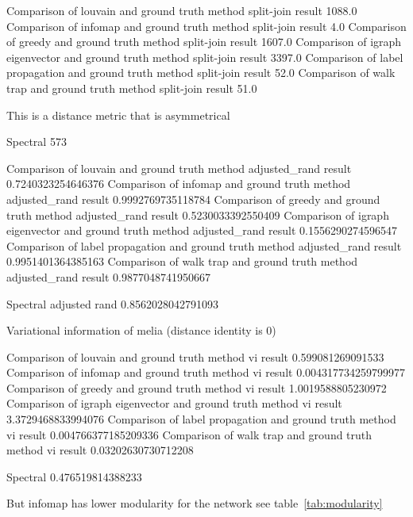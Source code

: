 




Comparison of louvain and ground truth method split-join result 1088.0
Comparison of infomap and ground truth method split-join result 4.0
Comparison of greedy and ground truth method split-join result 1607.0
Comparison of igraph eigenvector and ground truth method split-join result 3397.0
Comparison of label propagation and ground truth method split-join result 52.0
Comparison of walk trap and ground truth method split-join result 51.0

This is a distance metric that is asymmetrical

Spectral 573

Comparison of louvain and ground truth method adjusted\_rand result 0.7240323254646376
Comparison of infomap and ground truth method adjusted\_rand result 0.9992769735118784
Comparison of greedy and ground truth method adjusted\_rand result 0.5230033392550409
Comparison of igraph eigenvector and ground truth method adjusted\_rand result 0.1556290274596547
Comparison of label propagation and ground truth method adjusted\_rand result 0.9951401364385163
Comparison of walk trap and ground truth method adjusted\_rand result 0.9877048741950667


Spectral adjusted rand
0.8562028042791093

Variational information of melia (distance identity is 0)

Comparison of louvain and ground truth method vi result 0.599081269091533
Comparison of infomap and ground truth method vi result 0.004317734259799977
Comparison of greedy and ground truth method vi result 1.0019588805230972
Comparison of igraph eigenvector and ground truth method vi result 3.3729468833994076
Comparison of label propagation and ground truth method vi result 0.004766377185209336
Comparison of walk trap and ground truth method vi result 0.03202630730712208

Spectral 
0.476519814388233


But infomap has lower modularity for the network see table~\ref{tab:modularity}


